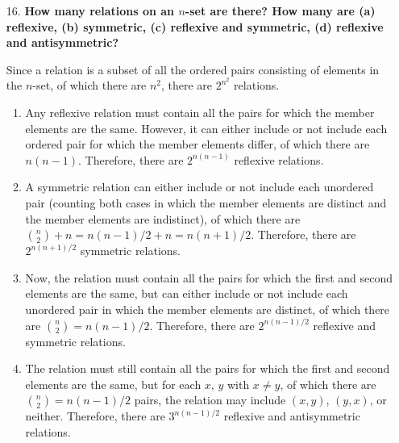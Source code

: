 \documentclass[a4paper,12pt]{article}
\begin{document}
\begin{enumerate}
    \item[16.]
        \boldmath
        \textbf{How many relations on an $n$-set are there? How many are (a) reflexive, (b) symmetric, (c) reflexive and symmetric, (d) reflexive and antisymmetric?} \par
        \unboldmath
        Since a relation is a subset of all the ordered pairs consisting of elements in the $n$-set, of which there are $n^2$, there are $2^{n^2}$ relations.
        \begin{enumerate}
            \item
                Any reflexive relation must contain all the pairs for which the member elements are the same. However, it can either include or not include each ordered pair for which the member elements differ, of which there are $n(n - 1)$. Therefore, there are $2^{n(n - 1)}$ reflexive relations.

            \item
                A symmetric relation can either include or not include each unordered pair (counting both cases in which the member elements are distinct and the member elements are indistinct), of which there are $\binom{n}{2} + n = n(n - 1)/2 + n = n(n + 1)/2$. Therefore, there are $2^{n(n + 1)/2}$ symmetric relations.

            \item
                Now, the relation must contain all the pairs for which the first and second elements are the same, but can either include or not include each unordered pair in which the member elements are distinct, of which there are $\binom{n}{2} = n(n - 1)/2$. Therefore, there are $2^{n(n - 1)/2}$ reflexive and symmetric relations.

            \item
                The relation must still contain all the pairs for which the first and second elements are the same, but for each $x$, $y$ with $x \neq y$, of which there are $\binom{n}{2} = n(n - 1)/2$ pairs, the relation may include $(x, y)$, $(y, x)$, or neither. Therefore, there are $3^{n(n - 1)/2}$ reflexive and antisymmetric relations.
        \end{enumerate}
\end{enumerate}
\end{document}
